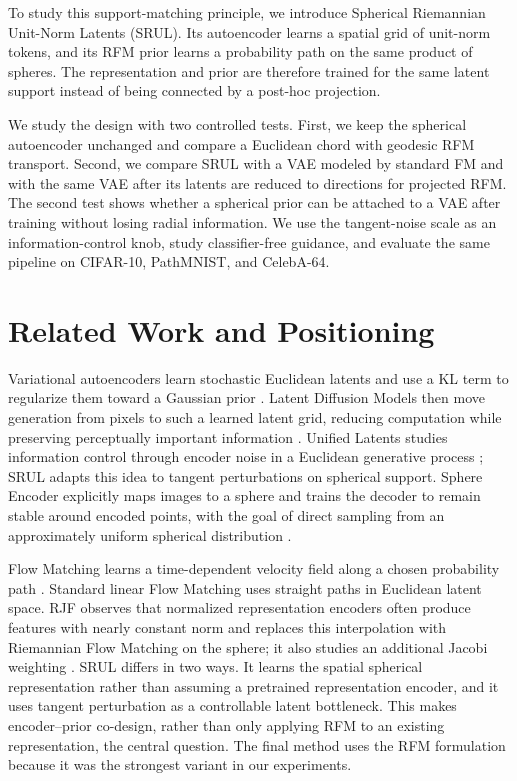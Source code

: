 \documentclass{article}
\begin{document}
To study this support-matching principle, we introduce Spherical Riemannian Unit-Norm Latents (SRUL). Its autoencoder learns a spatial grid of unit-norm tokens, and its RFM prior learns a probability path on the same product of spheres. The representation and prior are therefore trained for the same latent support instead of being connected by a post-hoc projection.

We study the design with two controlled tests. First, we keep the spherical autoencoder unchanged and compare a Euclidean chord with geodesic RFM transport. Second, we compare SRUL with a VAE modeled by standard FM and with the same VAE after its latents are reduced to directions for projected RFM. The second test shows whether a spherical prior can be attached to a VAE after training without losing radial information. We use the tangent-noise scale as an information-control knob, study classifier-free guidance, and evaluate the same pipeline on CIFAR-10, PathMNIST, and CelebA-64.

\section{Related Work and Positioning}
Variational autoencoders learn stochastic Euclidean latents and use a KL term to regularize them toward a Gaussian prior \cite{vae}. Latent Diffusion Models then move generation from pixels to such a learned latent grid, reducing computation while preserving perceptually important information \cite{ldm}. Unified Latents studies information control through encoder noise in a Euclidean generative process \cite{ul}; SRUL adapts this idea to tangent perturbations on spherical support. Sphere Encoder explicitly maps images to a sphere and trains the decoder to remain stable around encoded points, with the goal of direct sampling from an approximately uniform spherical distribution \cite{sphere}.

Flow Matching learns a time-dependent velocity field along a chosen probability path \cite{fm}. Standard linear Flow Matching uses straight paths in Euclidean latent space. RJF observes that normalized representation encoders often produce features with nearly constant norm and replaces this interpolation with Riemannian Flow Matching on the sphere; it also studies an additional Jacobi weighting \cite{rjf}. SRUL differs in two ways. It learns the spatial spherical representation rather than assuming a pretrained representation encoder, and it uses tangent perturbation as a controllable latent bottleneck. This makes encoder--prior co-design, rather than only applying RFM to an existing representation, the central question. The final method uses the RFM formulation because it was the strongest variant in our experiments.
\end{document}
